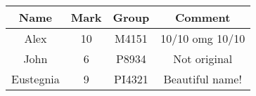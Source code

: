 \documentclass{article}
\begin{document}
\begin{tabular}{|c|c|c|c|}
\hline
Name & Mark & Group & Comment \\
\hline
Alex & 10 & M4151 & 10/10 omg 10/10 \\
\hline
John & 6 & P8934 & Not original \\
\hline
Eustegnia & 9 & PI4321 & Beautiful name! \\
\hline
\end{tabular}
\end{document}
